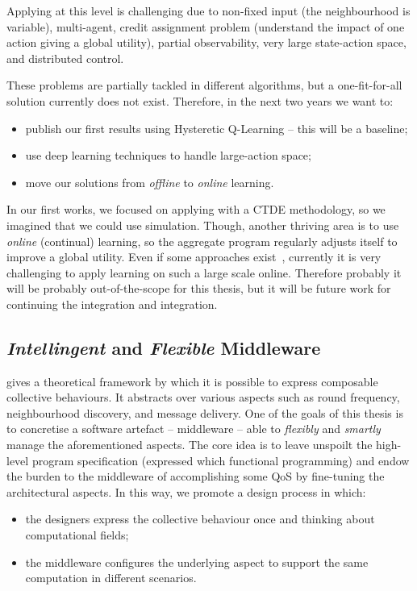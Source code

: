 \documentclass[11pt]{article}
\begin{document}
Applying \rl{} at this level is challenging due to non-fixed input (the neighbourhood is variable), multi-agent, credit assignment problem (understand the impact of one action giving a global utility), partial observability, very large state-action space, and distributed control.

These problems are partially tackled in different \marl{} algorithms, but a one-fit-for-all solution currently does not exist. Therefore, in the next two years we want to:
\begin{itemize}
	\item publish our first results using Hysteretic Q-Learning -- this will be a baseline;
	\item use deep learning techniques to handle large-action space;
	\item move our solutions from \emph{offline} to \emph{online} learning. 
\end{itemize}
In our first works, we focused on applying \rl{} with a CTDE methodology, so we imagined that we could use simulation.
Though, another thriving area is to use \emph{online} (continual) learning, so the aggregate program regularly adjusts itself to improve a global utility. Even if some approaches exist~\cite{DBLP:conf/icml/OmidshafieiPAHV17}, currently it is very challenging to apply learning on such a large scale online. Therefore probably it will be probably out-of-the-scope for this thesis, but it will be future work for continuing the integration \ac{} and \rl{} integration. 
\subsection{\emph{Intellingent} and \emph{Flexible} Middleware}\label{middleware}
\ac{} gives a theoretical framework by which it is possible to express composable collective behaviours. It abstracts over various aspects such as round frequency, neighbourhood discovery, and message delivery.
One of the goals of this thesis is to concretise a software artefact -- middleware -- able to \emph{flexibly} and \emph{smartly} manage the aforementioned aspects.
%
The core idea is to leave unspoilt the high-level program specification (expressed which functional programming) and endow the burden to the middleware of accomplishing some QoS by fine-tuning the architectural aspects. 
%
In this way, we promote a design process in which:
\begin{itemize}
	\item the designers express the collective behaviour once and thinking about computational fields;
	\item the middleware configures the underlying aspect to support the same computation in different scenarios.
\end{itemize}
\end{document}
